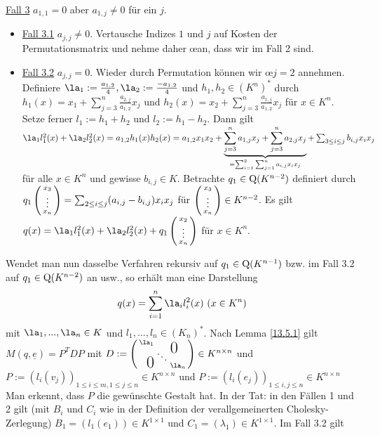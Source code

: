 \documentclass[../../main.tex]{subfiles}
\begin{document}
\begin{cproof}
\noindent\underline{Fall 3} $a_{1,1}=0$ aber $a_{1,j}\neq 0$ für ein $j$. 
\begin{itemize}
\item[ ]\underline{Fall 3.1} $a_{j,j}\neq 0$. Vertausche Indizes $1$ und $j$ auf Kosten der Permutationsmatrix und nehme daher \oe an, dass wir im Fall 2 sind.
\item[ ] \underline{Fall 3.2} $a_{j,j}=0$. Wieder durch Permutation können wir \oe $j=2$ annehmen. Definiere $\la_1:=\frac{a_{1,2}}{4}, \la_2:=\frac{-a_{1,2}}{4}$ und $h_1,h_2\in (K^n)^*$ durch $h_1(x)=x_1+\sum_{j=3}^n\frac{a_{2,j}}{a_{1,2}}x_j$ und $h_2(x)=x_2+\sum_{j=3}^n\frac{a_{1,j}}{a_{1,2}}x_j$ für $x\in K^n$. Setze ferner $l_1:=h_1+h_2$ und $l_2:=h_1-h_2$. Dann gilt $\la_1 l_1^2(x)+\la_2l_2^2(x)=a_{1,2}h_1(x)h_2(x)=a_{1,2}x_1x_2+\underbrace{\sum_{j=3}^n a_{1,j} x_j+\sum_{j=3}^n a_{2,j}x_j}_{=\sum_{i=1}^2\sum_{j=1}^n a_{i,j}x_ix_j}+\sum_{3\le i\le j}b_{i,j}x_ix_j$ für alle $x\in K^n$ und gewisse $b_{i,j}\in K$. Betrachte $q_1\in \operatorname{Q}(K^{n-2})$ definiert durch  $q_1\left(\begin{smallmatrix}x_3\\\vdots\\x_n\end{smallmatrix}\right)=\sum_{2\le i\le j} (a_{i,j}-b_{i,j})x_ix_j$ für $\left(\begin{smallmatrix}x_3\\\vdots\\x_n\end{smallmatrix}\right)\in K^{n-2}$. Es gilt $q(x)=\la_1l_1^2(x)+\la_2l_2^2(x)+q_1\cvec{x_2\\\vdots\\x_n}$ für $x\in K^n$.\\
\end{itemize}
Wendet man nun dasselbe Verfahren rekursiv auf $q_1\in \operatorname{Q}(K^{n-1})$ bzw. im Fall 3.2 auf $q_1\in \operatorname{Q}(K^{n-2})$ an usw., so erhält man eine Darstellung 
\begin{align*}
q(x)=\sum_{i=1}^n \la_il_i^2(x)\ (x\in K^n)
\end{align*}	 
mit $\la_1,...,\la_n\in K$ und $l_1,...,l_n\in (K_n)^*$. Nach Lemma \ref{13.5.1} gilt $M(q,\underline{e})=P^TDP$ mit $D:=\left(\begin{smallmatrix}
\la_1 & & \llap{$\overset{\blap{\LARGE 0}}{~}$} \\
& \ddots &\\
\rlap{\tlap{\LARGE 0}} & & \la_n\end{smallmatrix}\right)\in K^{n\times n}$ und $P:=(l_i(v_j))_{1\le i\le m, 1\le j\le n}\in K^{n\times n}$ und $P:=(l_i(e_j))_{1\le i,j\le n}\in K^{n\times n}$ Man erkennt, dass $P$ die gewünschte Gestalt hat. In der Tat: in den Fällen 1 und 2 gilt (mit $B_i$ und $C_i$ wie in der Definition der verallgemeinerten Cholesky-Zerlegung) $B_1=(l_1(e_1))\in K^{1\times 1}$ und $C_1=(\lambda_1)\in K^{1\times 1}$. Im Fall 3.2 gilt

\end{cproof}
\end{document}
